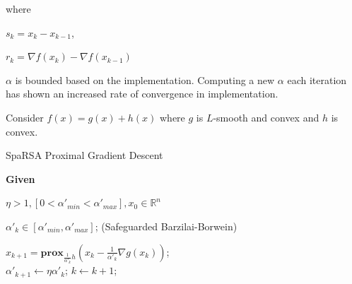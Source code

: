 \documentclass[10pt]{article} %
\begin{document}
\noindent where 

\begin{center}
    $s_k = x_k - x_{k-1}$,
    
    $r_k = \nabla f(x_k) - \nabla f(x_{k-1})$
\end{center}

$\alpha$ is bounded based on the implementation. Computing a new $\alpha$ each iteration has shown an increased rate of convergence in implementation. 

\vspace{\baselineskip}









Consider $f(x)=g(x)+h(x)$ where $g$ is $L$-smooth and convex and $h$ is convex.\\
\vspace{20pt}
\begin{algorithm}[H]
\caption{SpaRSA Proximal Gradient Descent}
\textbf{Given}

    \textbf{$\eta >1 ,[0 <\alpha'_{min} < \alpha'_{max}], x_0 \in \mathbb{R}^n$}

    {
        $\alpha'_k \in [\alpha'_{min}, \alpha'_{max}]$; \hspace{10pt}(Safeguarded Barzilai-Borwein)

            {$x_{k+1} = \mathbf{prox}_{\frac{1}{\alpha'_k}h}(x_k-\frac{1}{\alpha'_k}\nabla g(x_k))$;\\
            $\alpha'_{k+1} \xleftarrow{} \eta \alpha'_k$;
            }
        $k \xleftarrow{} k + 1$;
    }
\end{algorithm}
\end{document}
